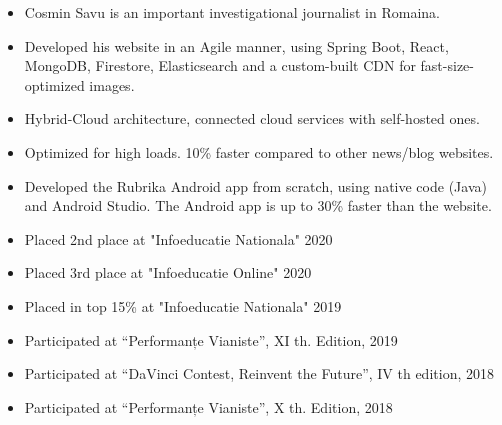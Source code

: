 \documentclass[10pt,a4paper,ragged2e]{resume}
\begin{document}

    \begin{fullwidth}
        \makecvheader
    \end{fullwidth}





    \begin{itemize}
        \item Cosmin Savu is an important investigational journalist in Romaina.
        \item Developed his website in an Agile manner, using Spring Boot, React, MongoDB, Firestore, Elasticsearch and a custom-built CDN for fast-size-optimized images.
        \item Hybrid-Cloud architecture, connected cloud services with self-hosted ones.
        \item Optimized for high loads. 10\% faster compared to other news/blog websites.
        \smallskip
    \end{itemize}

    \divider

    \begin{itemize}
        \item Developed the Rubrika Android app from scratch, using native code (Java) and Android Studio. The Android app is up to 30\% faster than the website.
        \smallskip
    \end{itemize}

    \smallskip
    \begin{itemize}
        \item Placed 2nd place at "Infoeducatie Nationala" 2020
        \item Placed 3rd place at "Infoeducatie Online" 2020
        \item Placed in top 15\% at "Infoeducatie Nationala" 2019
        \item Participated at \textquotedblleft Performanțe Vianiste\textquotedblright, XI th. Edition, 2019
        \item Participated at \textquotedblleft DaVinci Contest, Reinvent the Future\textquotedblright, IV th edition, 2018
        \item Participated at \textquotedblleft Performanțe Vianiste\textquotedblright, X th. Edition, 2018
    \end{itemize}
\end{document}

